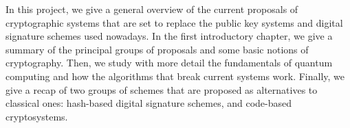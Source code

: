 

\begin{abstracts}

In this project, we give a general overview of the current proposals of cryptographic systems that are set to replace the public key systems and digital signature schemes used nowadays. In the first introductory chapter, we give a summary of the principal groups of proposals and some basic notions of cryptography. Then, we study with more detail the fundamentals of quantum computing and how the algorithms that break current systems work. Finally, we give a recap of two groups of schemes that are proposed as alternatives to classical ones: hash-based digital signature schemes, and code-based cryptosystems.

\end{abstracts}
